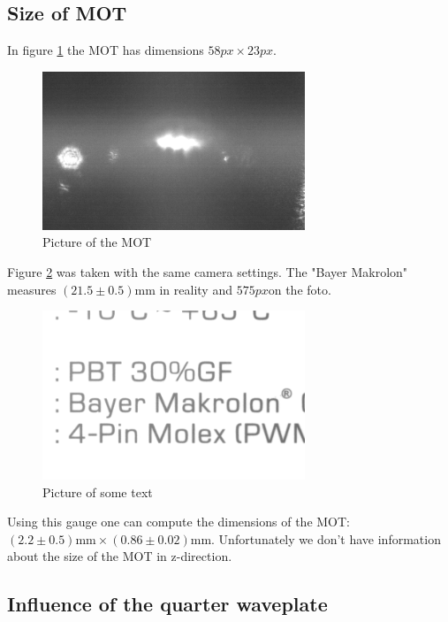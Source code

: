 \subsection{Size of MOT}
In figure \ref{fig:mot} the MOT has dimensions $58\si{px} \times 23\si{px}$. 

\begin{figure}
\centering
\includegraphics[width=0.7\textwidth]{figures/P102018/mot_2.png}
\caption{Picture of the MOT}
\label{fig:mot}
\end{figure}

Figure \ref{fig:karton} was taken with the same camera settings. The "Bayer Makrolon" measures $\si{(21.5 \pm 0.5) \milli\meter}$ in reality and $575 \si{px}$on the foto.

\begin{figure}
\centering
\includegraphics[width=0.7\textwidth]{figures/P102018/karton.png}
\caption{Picture of some text}
\label{fig:karton}
\end{figure}

Using this gauge one can compute the dimensions of the MOT: $\si{(2.2 \pm 0.5) \milli\meter \times (0.86 \pm 0.02) \milli\meter}$. Unfortunately we don't have information about the size of the MOT in z-direction.

\subsection{Influence of the quarter waveplate}

